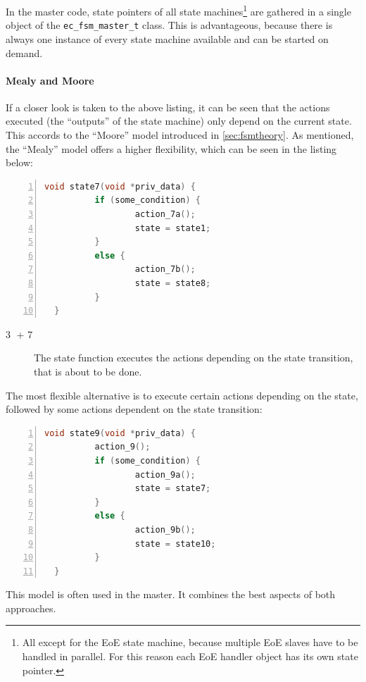 \documentclass[a4paper,12pt,BCOR=6mm,bibtotoc,idxtotoc]{scrbook}
\newcommand{\linenum}[1]{\normalfont\textcircled{\tiny #1}}
\begin{document}
In the master code, state pointers of all state machines\footnote{All except
for the EoE state machine, because multiple EoE slaves have to be handled in
parallel. For this reason each EoE handler object has its own state pointer.}
are gathered in a single object of the \lstinline+ec_fsm_master_t+ class. This
is advantageous, because there is always one instance of every state machine
available and can be started on demand.

\paragraph{Mealy and Moore}

If a closer look is taken to the above listing, it can be seen that the
actions executed (the ``outputs'' of the state machine) only depend on the
current state. This accords to the ``Moore'' model introduced in
\autoref{sec:fsmtheory}. As mentioned, the ``Mealy'' model offers a higher
flexibility, which can be seen in the listing below:

\begin{lstlisting}[gobble=2,language=C,numbers=left]
  void state7(void *priv_data) {
          if (some_condition) {
                  action_7a();
                  state = state1;
          }
          else {
                  action_7b();
                  state = state8;
          }
  }
\end{lstlisting}

\begin{description}

\item[\linenum{3} + \linenum{7}] The state function executes the actions
depending on the state transition, that is about to be done.

\end{description}

The most flexible alternative is to execute certain actions depending
on the state, followed by some actions dependent on the state
transition:

\begin{lstlisting}[gobble=2,language=C,numbers=left]
  void state9(void *priv_data) {
          action_9();
          if (some_condition) {
                  action_9a();
                  state = state7;
          }
          else {
                  action_9b();
                  state = state10;
          }
  }
\end{lstlisting}

This model is often used in the master. It combines the best aspects of both
approaches.
\end{document}
